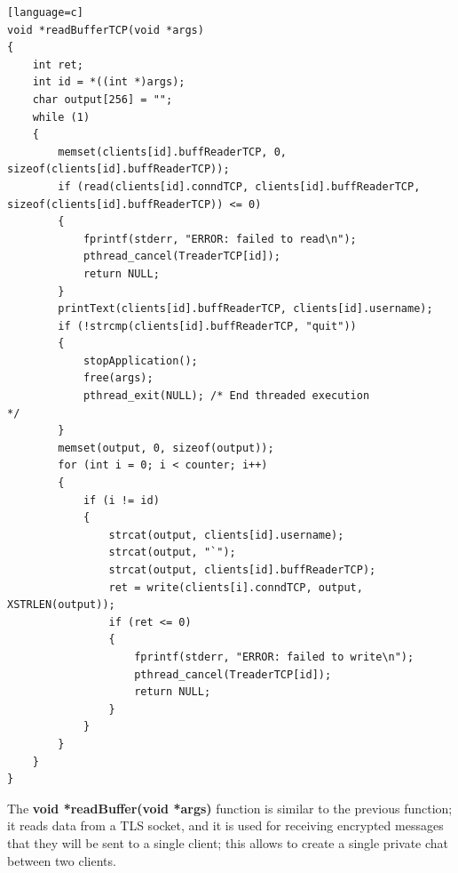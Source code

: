 \documentclass[a4paper,12pt]{article}
\begin{document}
\begin{lstlisting}[caption={void *readBufferTCP(void *args) of TLS server},captionpos=b][language=c]
void *readBufferTCP(void *args)
{
    int ret;
    int id = *((int *)args);
    char output[256] = "";
    while (1)
    {
        memset(clients[id].buffReaderTCP, 0, sizeof(clients[id].buffReaderTCP));
        if (read(clients[id].conndTCP, clients[id].buffReaderTCP, sizeof(clients[id].buffReaderTCP)) <= 0)
        {
            fprintf(stderr, "ERROR: failed to read\n");
            pthread_cancel(TreaderTCP[id]);
            return NULL;
        }
        printText(clients[id].buffReaderTCP, clients[id].username);
        if (!strcmp(clients[id].buffReaderTCP, "quit"))
        {
            stopApplication();
            free(args);
            pthread_exit(NULL); /* End threaded execution                */
        }
        memset(output, 0, sizeof(output));
        for (int i = 0; i < counter; i++)
        {
            if (i != id)
            {
                strcat(output, clients[id].username);
                strcat(output, "`");
                strcat(output, clients[id].buffReaderTCP);
                ret = write(clients[i].conndTCP, output, XSTRLEN(output));
                if (ret <= 0)
                {
                    fprintf(stderr, "ERROR: failed to write\n");
                    pthread_cancel(TreaderTCP[id]);
                    return NULL;
                }
            }
        }
    }
}
\end{lstlisting}
The \textbf{void *readBuffer(void *args)} function is similar to the previous function; it reads data from a TLS socket, and it is used for receiving encrypted messages that they will be sent to a single client; this allows to create a single private chat between two clients.
\end{document}
